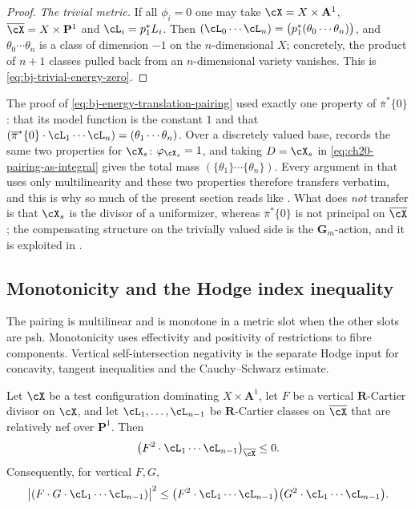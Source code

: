\begin{proof}
\emph{The trivial metric.}  If all $\phi_i=0$ one may take
$\cX=X\times\mathbf A^1$, $\overline\cX=X\times\mathbf P^1$ and
$\cL_i=p_1^*L_i$.  Then
$(\cL_0\cdots\cL_n)=\bigl(p_1^*(\theta_0\cdots\theta_n)\bigr)$, and
$\theta_0\cdots\theta_n$ is a class of dimension $-1$ on the
$n$-dimensional $X$; concretely, the product of $n+1$ classes pulled
back from an $n$-dimensional variety vanishes.  This is
\eqref{eq:bj-trivial-energy-zero}.
\end{proof}

\begin{remark}
\label{rem:ch46-fibre-class}
The proof of \eqref{eq:bj-energy-translation-pairing} used exactly one
property of $\overline\pi^*\{0\}$: that its model function is the
constant $1$ and that
$(\overline\pi^*\{0\}\cdot\cL_1\cdots\cL_n)=(\theta_1\cdots\theta_n)$.
Over a discretely valued base,  records the same two
properties for $\cX_s$: $\varphi_{\cX_s}=1$, and taking
$D=\cX_s$ in \eqref{eq:ch20-pairing-as-integral} gives the total mass
$(\{\theta_1\}\cdots\{\theta_n\})$.  Every argument in
 that uses only multilinearity and these two
properties therefore transfers verbatim, and this is why so much of the
present section reads like .  What does
\emph{not} transfer is that $\cX_s$ is the divisor of a uniformizer,
whereas $\overline\pi^*\{0\}$ is not principal on $\overline\cX$; the
compensating structure on the trivially valued side is the
$\mathbf G_m$-action, and it is exploited in
.
\end{remark}

\subsection{Monotonicity and the Hodge index inequality}
\label{sec:ch46-monotonicity}

The pairing is multilinear and is monotone in a metric slot when the
other slots are psh.  Monotonicity uses effectivity and positivity of
restrictions to fibre components.  Vertical self-intersection negativity
is the separate Hodge input for concavity, tangent inequalities and
the Cauchy--Schwarz estimate.

\begin{lemma}
\label{lem:ch46-vertical-negativity}
Let $\cX$ be a test configuration dominating $X\times\mathbf A^1$, let
$F$ be a vertical $\mathbf R$-Cartier divisor on $\cX$, and let
$\cL_1,\dots,\cL_{n-1}$ be $\mathbf R$-Cartier classes on
$\overline\cX$ that are relatively nef over $\mathbf P^1$.  Then
\[
 \bigl(F^2\cdot\cL_1\cdots\cL_{n-1}\bigr)_{\overline\cX}\le0 .
\]
Consequently, for vertical $F,G$,
\[
 \bigl|(F\cdot G\cdot\cL_1\cdots\cL_{n-1})\bigr|^2
 \le
 \bigl(F^2\cdot\cL_1\cdots\cL_{n-1}\bigr)
 \bigl(G^2\cdot\cL_1\cdots\cL_{n-1}\bigr).
\]
\end{lemma}

